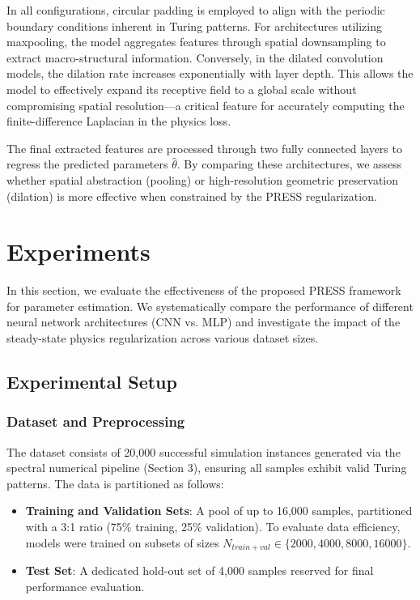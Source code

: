 \documentclass{article} %
\begin{document}
In all configurations, circular padding is employed to align with the periodic boundary conditions inherent in Turing patterns. For architectures utilizing maxpooling, the model aggregates features through spatial downsampling to extract macro-structural information. Conversely, in the dilated convolution models, the dilation rate increases exponentially with layer depth. This allows the model to effectively expand its receptive field to a global scale without compromising spatial resolution—a critical feature for accurately computing the finite-difference Laplacian in the physics loss.

The final extracted features are processed through two fully connected layers to regress the predicted parameters $\hat{\theta}$. By comparing these architectures, we assess whether spatial abstraction (pooling) or high-resolution geometric preservation (dilation) is more effective when constrained by the PRESS regularization.

\section{Experiments}

\label{sec:experiments}

In this section, we evaluate the effectiveness of the proposed PRESS framework for parameter estimation. We systematically compare the performance of different neural network architectures (CNN vs. MLP) and investigate the impact of the steady-state physics regularization across various dataset sizes.

\subsection{Experimental Setup}

\subsubsection{Dataset and Preprocessing}

The dataset consists of 20,000 successful simulation instances generated via the spectral numerical pipeline (Section 3), ensuring all samples exhibit valid Turing patterns. The data is partitioned as follows:

\begin{itemize}

\item \textbf{Training and Validation Sets}: A pool of up to 16,000 samples, partitioned with a 3:1 ratio (75\% training, 25\% validation). To evaluate data efficiency, models were trained on subsets of sizes $N_{train+val} \in \{2000, 4000, 8000, 16000\}$.

\item \textbf{Test Set}: A dedicated hold-out set of 4,000 samples reserved for final performance evaluation.

\end{itemize}
\end{document}
